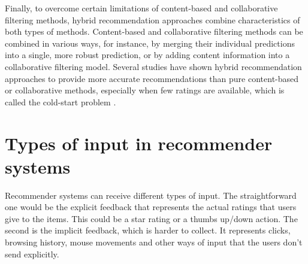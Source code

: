 Finally, to overcome certain limitations of content-based and collaborative filtering methods, hybrid recommendation approaches combine characteristics of both types of methods. Content-based and collaborative filtering methods can be combined in various ways, for instance, by merging their individual predictions into a single, more robust prediction, or by adding content information into a collaborative filtering model. Several studies have shown hybrid recommendation approaches to provide more accurate recommendations than pure content-based or collaborative methods, especially when few ratings are available, which is called the cold-start problem \cite{desrosiers2011comprehensive}.

\section{Types of input in recommender systems}

Recommender systems can receive different types of input. The straightforward one would be the explicit feedback that represents the actual ratings that users give to the items. This could be a star rating or a thumbs up/down action. The second is the implicit feedback, which is harder to collect. It represents clicks, browsing history, mouse movements and other ways of input that the users don't send explicitly.

